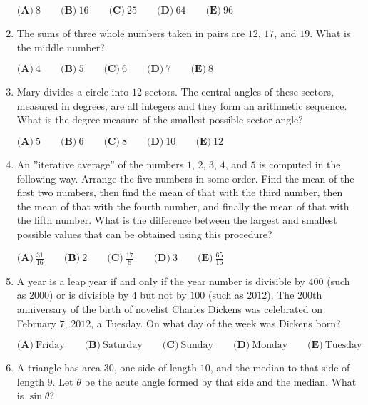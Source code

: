 \documentclass{article}
\begin{document}
\begin{enumerate}[label=\arabic*., itemsep=0.5em]
\( \textbf{(A)}\ 8\qquad\textbf{(B)}\ 16\qquad\textbf{(C)}\ 25\qquad\textbf{(D)}\ 64\qquad\textbf{(E)}\ 96 \)\par \vspace{0.5em}\item The sums of three whole numbers taken in pairs are \(12\), \(17\), and \(19\).  What is the middle number?

\( \textbf{(A)}\ 4\qquad\textbf{(B)}\ 5\qquad\textbf{(C)}\ 6\qquad\textbf{(D)}\ 7\qquad\textbf{(E)}\ 8 \)\par \vspace{0.5em}\item Mary divides a circle into \(12\) sectors.  The central angles of these sectors, measured in degrees, are all integers and they form an arithmetic sequence.  What is the degree measure of the smallest possible sector angle?

\( \textbf{(A)}\ 5\qquad\textbf{(B)}\ 6\qquad\textbf{(C)}\ 8\qquad\textbf{(D)}\ 10\qquad\textbf{(E)}\ 12 \)\par \vspace{0.5em}\item An ''iterative average'' of the numbers \(1\), \(2\), \(3\), \(4\), and \(5\) is computed in the following way.  Arrange the five numbers in some order.  Find the mean of the first two numbers, then find the mean of that with the third number, then the mean of that with the fourth number, and finally the mean of that with the fifth number.  What is the difference between the largest and smallest possible values that can be obtained using this procedure?

\( \textbf{(A)}\ \frac{31}{16}\qquad\textbf{(B)}\ 2\qquad\textbf{(C)}\ \frac{17}{8}\qquad\textbf{(D)}\ 3\qquad\textbf{(E)}\ \frac{65}{16} \)\par \vspace{0.5em}\item A year is a leap year if and only if the year number is divisible by \(400\) (such as \(2000\)) or is divisible by \(4\) but not by \(100\) (such as \(2012\)).  The \(200\text{th}\) anniversary of the birth of novelist Charles Dickens was celebrated on February \(7\), \(2012\), a Tuesday.  On what day of the week was Dickens born?

\( \textbf{(A)}\ \text{Friday}
\qquad\textbf{(B)}\ \text{Saturday}
\qquad\textbf{(C)}\ \text{Sunday}
\qquad\textbf{(D)}\ \text{Monday}
\qquad\textbf{(E)}\ \text{Tuesday}
 \)\par \vspace{0.5em}\item A triangle has area \(30\), one side of length \(10\), and the median to that side of length \(9\).  Let \(\theta\) be the acute angle formed by that side and the median.  What is \(\sin{\theta}\)?


\end{enumerate}
\end{document}
